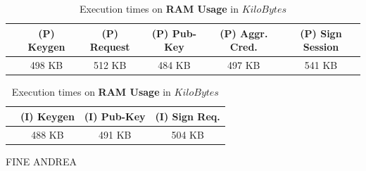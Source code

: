 \documentclass[twocolumn]{article}
\begin{document}
\begin{table}[h!]
  \begin{center}
    \caption{Execution times on \textbf{RAM Usage} in $KiloBytes$}
      \label{tab:table1}
        \begin{tabular} {c|c|c|c|c|c}
          \toprule
         & \textbf{(P) Keygen} & \textbf{(P) Request} & \textbf{(P) Pub-Key} & \textbf{(P) Aggr. Cred.} & \textbf{(P) Sign Session} \\
          \midrule
 			& 498 KB	&  512 KB	&  484 KB	&  497 KB	&  541 KB	\\


      \bottomrule %
    \end{tabular}
  \end{center}
\end{table}

\begin{table}[h!]
  \begin{center}
    \caption{Execution times on \textbf{RAM Usage} in $KiloBytes$}
      \label{tab:table1}
        \begin{tabular} {c|c|c|c}
          \toprule
          &  \textbf{(I) Keygen}& \textbf{(I) Pub-Key}& \textbf{(I) Sign Req.} \\
          \midrule
				&	488 KB	&  491 KB	&  504 KB	\\
      \bottomrule %
    \end{tabular}
  \end{center}
\end{table}



FINE ANDREA

\newpage









\listoffigures


\end{document}

